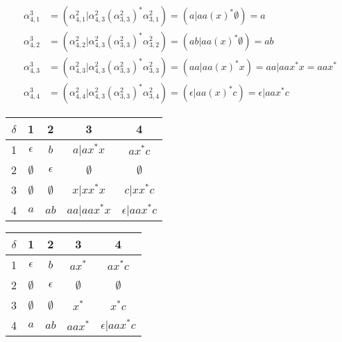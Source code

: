 \documentclass{article}
\begin{document}
\begin{align*}
\alpha^3_{4,1} &= \left(\alpha^2_{4,1}|\alpha^2_{4,3}\left(\alpha^2_{3,3}\right)^*\alpha^2_{3,1}\right) = \left(a|aa\left(x\right)^*\emptyset\right) = a \\
\alpha^3_{4,2} &= \left(\alpha^2_{4,2}|\alpha^2_{4,3}\left(\alpha^2_{3,3}\right)^*\alpha^2_{3,2}\right) = \left(ab|aa\left(x\right)^*\emptyset\right) = ab \\
\alpha^3_{4,3} &= \left(\alpha^2_{4,3}|\alpha^2_{4,3}\left(\alpha^2_{3,3}\right)^*\alpha^2_{3,3}\right) = \left(aa|aa\left(x\right)^*x\right) = aa|aax^*x = aax^* \\
\alpha^3_{4,4} &= \left(\alpha^2_{4,4}|\alpha^2_{4,3}\left(\alpha^2_{3,3}\right)^*\alpha^2_{3,4}\right) = \left(\epsilon|aa\left(x\right)^*c\right) = \epsilon|aax^*c
\end{align*}

\begin{center}
\begin{tabular}{c||*{3}{c|}c}
$\delta$ & 1 & 2 & 3 & 4 \\
  \hline \hline
1 & $\epsilon$  & $b$         & $a|ax^*x$   & $ax^*c$            \\ \hline
2 & $\emptyset$ & $\epsilon$  & $\emptyset$ & $\emptyset$        \\ \hline
3 & $\emptyset$ & $\emptyset$ & $x|xx^*x$   & $c|xx^*c$          \\ \hline
4 & $a$         & $ab$        & $aa|aax^*x$ & $\epsilon|aax^*c$  \\
\end{tabular}

\begin{tabular}{c||*{3}{c|}c}
$\delta$ & 1 & 2 & 3 & 4 \\
  \hline \hline
1 & $\epsilon$  & $b$         & $ax^*$      & $ax^*c$            \\ \hline
2 & $\emptyset$ & $\epsilon$  & $\emptyset$ & $\emptyset$        \\ \hline
3 & $\emptyset$ & $\emptyset$ & $x^*$        & $x^*c$             \\ \hline
4 & $a$         & $ab$        & $aax^*$     & $\epsilon|aax^*c$  \\
\end{tabular}
\end{center}
\end{document}
